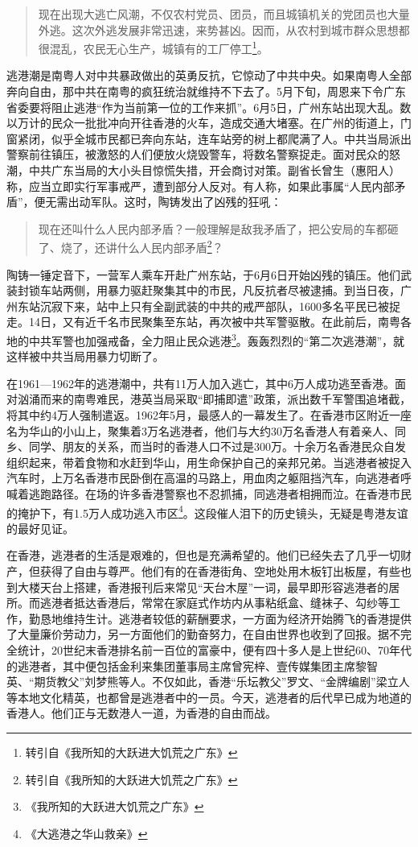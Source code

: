 \begin{quote}

现在出现大逃亡风潮，不仅农村党员、团员，而且城镇机关的党团员也大量外逃。这次外逃发展非常迅速，来势甚凶。因而，从农村到城市群众思想都很混乱，农民无心生产，城镇有的工厂停工\footnote{转引自《我所知的大跃进大饥荒之广东》}。

\end{quote}

逃港潮是南粤人对中共暴政做出的英勇反抗，它惊动了中共中央。如果南粤人全部奔向自由，那中共在南粤的疯狂统治就维持不下去了。5月下旬，周恩来下令广东省委要将阻止逃港“作为当前第一位的工作来抓”。6月5日，广州东站出现大乱。数以万计的民众一批批冲向开往香港的火车，造成交通大堵塞。在广州的街道上，门窗紧闭，似乎全城市民都已奔向东站，连车站旁的树上都爬满了人。中共当局派出警察前往镇压，被激怒的人们便放火烧毁警车，将数名警察捉走。面对民众的怒潮，中共广东当局的大小头目惊慌失措，开会商讨对策。副省长曾生（惠阳人）称，应当立即实行军事戒严，遭到部分人反对。有人称，如果此事属“人民内部矛盾”，便无需出动军队。这时，陶铸发出了凶残的狂吼：

\begin{quote}
现在还叫什么人民内部矛盾？一般理解是敌我矛盾了，把公安局的车都砸了、烧了，还讲什么人民内部矛盾\footnote{转引自《我所知的大跃进大饥荒之广东》}？
\end{quote}

陶铸一锤定音下，一营军人乘车开赴广州东站，于6月6日开始凶残的镇压。他们武装封锁车站两侧，用暴力驱赶聚集其中的市民，凡反抗者尽被逮捕。到当日夜，广州东站沉寂下来，站中上只有全副武装的中共的戒严部队，1600多名平民已被捉走。14日，又有近千名市民聚集至东站，再次被中共军警驱散。在此前后，南粤各地的中共军警也加强戒备，全力阻止民众逃港\footnote{《我所知的大跃进大饥荒之广东》}。轰轰烈烈的“第二次逃港潮”，就这样被中共当局用暴力切断了。

在1961—1962年的逃港潮中，共有11万人加入逃亡，其中6万人成功逃至香港。面对汹涌而来的南粤难民，港英当局采取“即捕即遣”政策，派出数千军警围追堵截，将其中约4万人强制遣返。1962年5月，最感人的一幕发生了。在香港市区附近一座名为华山的小山上，聚集着3万名逃港者，他们与大约30万名香港人有着亲人、同乡、同学、朋友的关系，而当时的香港人口不过是300万。十余万名香港民众自发组织起来，带着食物和水赶到华山，用生命保护自己的亲邦兄弟。当逃港者被捉入汽车时，上万名香港市民卧倒在高温的马路上，用血肉之躯阻挡汽车，向逃港者呼喊着逃跑路径。在场的许多香港警察也不忍抓捕，同逃港者相拥而泣。在香港市民的掩护下，有1.5万人成功逃入市区\footnote{《大逃港之华山救亲》}。这段催人泪下的历史镜头，无疑是粤港友谊的最好见证。

在香港，逃港者的生活是艰难的，但也是充满希望的。他们已经失去了几乎一切财产，但获得了自由与尊严。他们有的在香港街角、空地处用木板钉出板屋，有些也到大楼天台上搭建，香港报刊后来常见“天台木屋”一词，最早即形容逃港者的居所。而逃港者抵达香港后，常常在家庭式作坊内从事粘纸盒、缝袜子、勾纱等工作，勤恳地维持生计。逃港者较低的薪酬要求，一方面为经济开始腾飞的香港提供了大量廉价劳动力，另一方面他们的勤奋努力，在自由世界也收到了回报。据不完全统计，20世纪末香港排名前一百位的富豪中，便有四十多人是上世纪60、70年代的逃港者，其中便包括金利来集团董事局主席曾宪梓、壹传媒集团主席黎智英、“期货教父”刘梦熊等人。不仅如此，香港“乐坛教父”罗文、“金牌编剧”梁立人等本地文化精英，也都曾是逃港者中的一员。今天，逃港者的后代早已成为地道的香港人。他们正与无数港人一道，为香港的自由而战。


